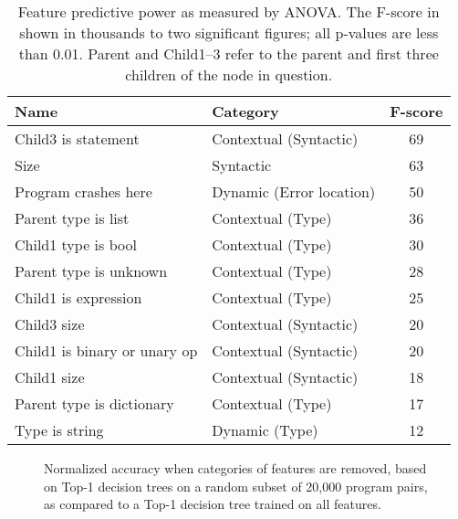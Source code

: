 \documentclass[conference]{IEEEtran}
\begin{document}
\begin{table}[]
\begin{center}
\begin{tabular}{llc}
Name                     & Category                & F-score \\ \bottomrule
Child3 is statement          & Contextual (Syntactic)  & 69 \\
Size                     & Syntactic               & 63 \\
Program crashes here     & Dynamic (Error location)& 50 \\
Parent type is list           & Contextual (Type)       & 36 \\
Child1 type is bool          & Contextual (Type)       & 30 \\
Parent type is unknown        & Contextual (Type)       & 28 \\
Child1 is expression         & Contextual (Type)       & 25 \\
Child3 size                  & Contextual (Syntactic)  & 20 \\
Child1 is binary or unary op & Contextual (Syntactic)  & 20 \\
Child1 size                  & Contextual (Syntactic)  & 18 \\
Parent type is dictionary     & Contextual (Type)       & 17 \\
Type is string           & Dynamic (Type)          & 12 \\
\toprule
\end{tabular}
\end{center}
\caption{Feature predictive power as measured by ANOVA.  The F-score in
shown in
thousands to two significant figures; all p-values are less than 0.01.
Parent and Child1--3 refer to the parent and first three children of
the node in question.}
\label{tab-anova}
\end{table}

\begin{figure}
\caption{Normalized accuracy when categories of features are removed, based
on Top-1 decision trees on a random subset of 20,000 program pairs, as
compared to a Top-1 decision tree trained on all features.
}
\label{fig-removing-features}
\end{figure}
\end{document}

